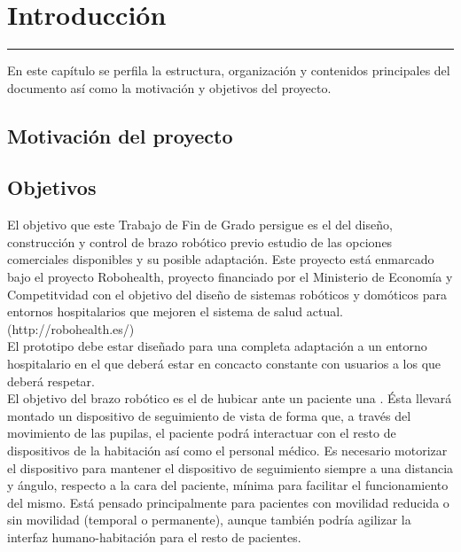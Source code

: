 \chapter{Introducción} \label{chap:Introduccion}
\hrule
\vspace{3mm}

En este capítulo se perfila la estructura, organización y contenidos principales del documento así como la motivación y objetivos del proyecto.


\section{Motivación del proyecto}



\section{Objetivos}

El objetivo que este Trabajo de Fin de Grado persigue es el del diseño, construcción y control de brazo robótico previo estudio de las opciones comerciales disponibles y su posible adaptación. Este proyecto está enmarcado bajo el proyecto Robohealth, proyecto financiado por el Ministerio de Economía y Competitvidad con el objetivo del diseño de sistemas robóticos y domóticos para entornos hospitalarios que mejoren el sistema de salud actual. (\completar http://robohealth.es/)
\\

El  prototipo debe estar diseñado para una completa adaptación a un entorno hospitalario en el que deberá estar en concacto constante con usuarios a los que deberá respetar.
\\

El objetivo del brazo robótico es el de hubicar ante un paciente una . Ésta llevará montado un dispositivo de seguimiento de vista de forma que, a través del movimiento de las pupilas, el paciente podrá interactuar con el resto de dispositivos de la habitación así como el personal médico. Es necesario motorizar el dispositivo para mantener el dispositivo de seguimiento siempre a una distancia y ángulo, respecto a la cara del paciente, mínima para facilitar el funcionamiento del mismo. Está pensado principalmente para pacientes con movilidad reducida o sin movilidad (temporal o permanente), aunque también podría agilizar la interfaz humano-habitación para el resto de pacientes.
\\


